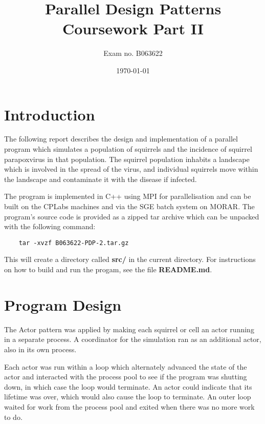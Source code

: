 \documentclass[11pt, oneside]{article}   %
\title{Parallel Design Patterns Coursework Part II}
\author{Exam no. B063622}
\date{\today}
\begin{document}
\maketitle

\newpage

\tableofcontents

\newpage


\section{Introduction}

The following report describes the design and implementation of a parallel program which simulates a population of squirrels and the incidence of squirrel parapoxvirus in that population.
The squirrel population inhabits a landscape which is involved in the spread of the virus, and individual squirrels move within the landscape and contaminate it with the disease if infected.

The program is implemented in C++ using MPI for parallelisation and can be built on the CPLabs machines and via the SGE batch system on MORAR.
The program's source code is provided as a zipped tar archive which can be unpacked with the following command:

\begin{lstlisting}
	tar -xvzf B063622-PDP-2.tar.gz
\end{lstlisting}

This will create a directory called \textbf{src/} in the current directory.  
For instructions on how to build and run the progam, see the file \textbf{README.md}.

\newpage

\section{Program Design}

The Actor pattern was applied by making each squirrel or cell an actor running in a separate process.
A coordinator for the simulation ran as an additional actor, also in its own process.

Each actor was run within a loop which alternately advanced the state of the actor and interacted with the process pool to see if the program was shutting down, in which case the loop would terminate.
An actor could indicate that its lifetime was over, which would also cause the loop to terminate.
An outer loop waited for work from the process pool and exited when there was no more work to do.  
\end{document}
